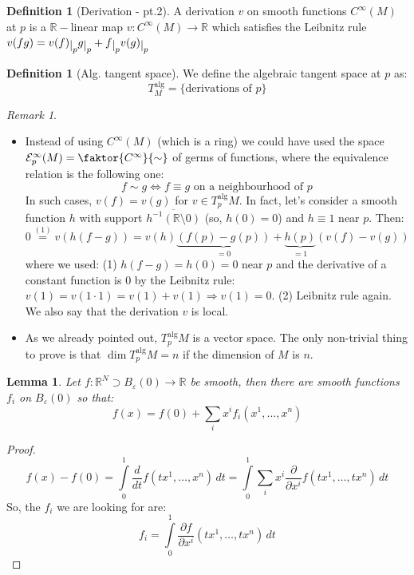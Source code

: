 \documentclass[a4paper,11pt,titlepage, article, oneside]{memoir}
\numberwithin{equation}{section}
\newtheorem{lemma}[theorem]{Lemma}
\theoremstyle{definition}
\newtheorem{definition}[theorem]{Definition}
\theoremstyle{remark}
\newtheorem{remark}[theorem]{Remark}
\newcommand{\rfield}{\mathbb{R}}
\newcommand{\restrict}[2]{{#1}\raisebox{-.5ex}{$|$}_{#2}}
\newcommand{\diondi}[1]{\frac{d}{d{#1}}}
\newcommand{\deonde}[1]{\frac{\partial}{\partial {#1}}}
\newcommand{\defonde}[2]{\frac{\partial {#1}}{\partial {#2}}}
\newcommand{\tangentalg}[1]{T_{#1}^{\text{alg}}}
\begin{document}
\begin{definition}[Derivation - pt.2]
A derivation $v$ on smooth functions $C^{\infty}(M)$ at $p$ is a $\rfield-$linear map $v \colon C^{\infty}(M) \rightarrow \rfield$ which satisfies the Leibnitz rule $v(fg) = \restrict{v(f)}{p} \restrict{g}{p} + \restrict{f}{p}\restrict{v(g)}{p}$
\end{definition}

\begin{definition}[Alg. tangent space]
We define the algebraic tangent space at $p$ as:
\begin{equation*}
\tangentalg M = \{\text{derivations of } p \}
\end{equation*}
\end{definition}

\begin{remarkbox}\begin{remark}
$ $
\begin{itemize}
\item Instead of using $C^{\infty}(M)$ (which is a ring) we could have used the space $\mathcal{E}^{\infty}_p (M) = \faktor{C^{\infty}}{\sim}$ of germs of functions, where the equivalence relation is the following one:
$$f \sim g \Leftrightarrow f \equiv g \text{ on a neighbourhood of } p$$
In such cases, $v(f) = v(g)$ for $v \in \tangentalg{p} M$. In fact, let's consider a smooth function $h$ with support $\overline{h^{-1}(\rfield \setminus {0})}$ (so, $h(0) = 0$) and $h \equiv 1$ near $p$. Then:
$$0 \overset{(1)} {=} v\left(h(f-g)\right) = v(h)\underbrace{\left(f(p) - g(p)\right)}_{=0} + \underbrace{h(p)}_{=1}\left (v(f) - v(g) \right)$$
where we used: (1) $h(f-g) = h(0) = 0$ near $p$ and the derivative of a constant function is 0 by the Leibnitz rule: $v(1) = v(1\cdot 1) = v(1)+v(1) \Rightarrow v(1)=0$. (2) Leibnitz rule again.
We also say that the derivation $v$ is local.
\item As we already pointed out, $\tangentalg{p} M$ is a vector space. The only non-trivial thing to prove is that $\dim \tangentalg {p}M = n$ if the dimension of $M$ is $n$. 
\end{itemize}
\end{remark}\end{remarkbox}

\begin{lemma} \label{usefullemma}
Let $f \colon \rfield^N \supset B_{\varepsilon}(0) \rightarrow \rfield$ be smooth, then there are smooth functions $f_i$ on $B_{\varepsilon}(0)$ so that:
\begin{equation}
f(x) = f(0) + \sum\limits_i x^i f_i(x^1, \ldots, x^n)
\end{equation}
\end{lemma}
\begin{proof}
\begin{equation*}
f(x)-f(0) = \int\limits_0^1 \diondi{t} f(tx^1, \ldots, x^n)\, dt = \int\limits_0^1 \sum_i x^i \deonde{x^i} f(tx^1, \ldots, tx^n) \, dt
\end{equation*}
So, the $f_i$ we are looking for are:
\begin{equation*}
f_i = \int\limits_0^1 \defonde{f}{x^i}(tx^1, \ldots, tx^n)\, dt
\end{equation*}
\end{proof}
\end{document}
